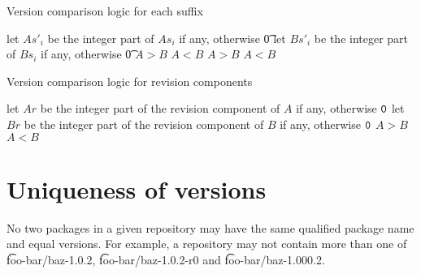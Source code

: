 \begin{algorithm}[p]
\caption{Version comparison logic for each suffix} \label{alg:version-comparison-suffix-each}
\begin{algorithmic}[1]
    \STATE let $As'_i$ be the integer part of $As_i$ if any, otherwise \t{0}
    \STATE let $Bs'_i$ be the integer part of $Bs_i$ if any, otherwise \t{0}
      \RETURN $A>B$
      \RETURN $A<B$
    \ENDIF
    \RETURN $A>B$
  \ELSE
    \RETURN $A<B$
  \ENDIF
\end{algorithmic}
\end{algorithm}

\begin{algorithm}[p]
\caption{Version comparison logic for revision components} \label{alg:version-comparison-revision}
\begin{algorithmic}[1]
  \STATE let $Ar$ be the integer part of the revision component of $A$ if any, otherwise $\texttt{0}$
  \STATE let $Br$ be the integer part of the revision component of $B$ if any, otherwise $\texttt{0}$
    \RETURN $A>B$
    \RETURN $A<B$
  \ENDIF
\end{algorithmic}
\end{algorithm}

\section{Uniqueness of versions}

No two packages in a given repository may have the same qualified package name and equal versions.
For example, a repository may not contain more than one of \t{foo-bar/baz-1.0.2},
\t{foo-bar/baz-1.0.2-r0} and \t{foo-bar/baz-1.000.2}.


